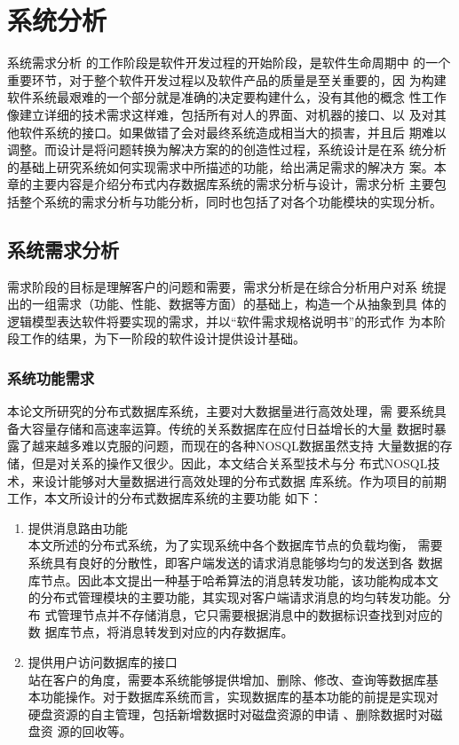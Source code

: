 
\chapter{系统分析}
系统需求分析
的工作阶段是软件开发过程的开始阶段，是软件生命周期中
的一个重要环节，对于整个软件开发过程以及软件产品的质量是至关重要的，因
为构建软件系统最艰难的一个部分就是准确的决定要构建什么，没有其他的概念
性工作像建立详细的技术需求这样难，包括所有对人的界面、对机器的接口、以
及对其他软件系统的接口。如果做错了会对最终系统造成相当大的损害，并且后
期难以调整。而设计是将问题转换为解决方案的的创造性过程，系统设计是在系
统分析的基础上研究系统如何实现需求中所描述的功能，给出满足需求的解决方
案。本章的主要内容是介绍分布式内存数据库系统的需求分析与设计，需求分析
主要包括整个系统的需求分析与功能分析，同时也包括了对各个功能模块的实现分析。
\section{系统需求分析}
需求阶段的目标是理解客户的问题和需要，需求分析是在综合分析用户对系
统提出的一组需求（功能、性能、数据等方面）的基础上，构造一个从抽象到具
体的逻辑模型表达软件将要实现的需求，并以“软件需求规格说明书”的形式作
为本阶段工作的结果，为下一阶段的软件设计提供设计基础。
\subsection{系统功能需求}
本论文所研究的分布式数据库系统，主要对大数据量进行高效处理，需
要系统具备大容量存储和高速率运算。传统的关系数据库在应付日益增长的大量
数据时暴露了越来越多难以克服的问题，而现在的各种NOSQL数据虽然支持
大量数据的存储，但是对关系的操作又很少。因此，本文结合关系型技术与分
布式NOSQL技术，来设计能够对大量数据进行高效处理的分布式数据
库系统。作为项目的前期工作，本文所设计的分布式数据库系统的主要功能
如下：
\begin{enumerate}
	\item 提供消息路由功能\\
	本文所述的分布式系统，为了实现系统中各个数据库节点的负载均衡，
	需要系统具有良好的分散性，即客户端发送的请求消息能够均匀的发送到各
	数据库节点。因此本文提出一种基于哈希算法的消息转发功能，该功能构成本文
	的分布式管理模块的主要功能，其实现对客户端请求消息的均匀转发功能。分布
	式管理节点并不存储消息，它只需要根据消息中的数据标识查找到对应的数
	据库节点，将消息转发到对应的内存数据库。
	\item 提供用户访问数据库的接口\\
	站在客户的角度，需要本系统能够提供增加、删除、修改、查询等数据库基
	本功能操作。对于数据库系统而言，实现数据库的基本功能的前提是实现对
	硬盘资源的自主管理，包括新增数据时对磁盘资源的申请
	、删除数据时对磁盘资
	源的回收等。
\end{enumerate}	

